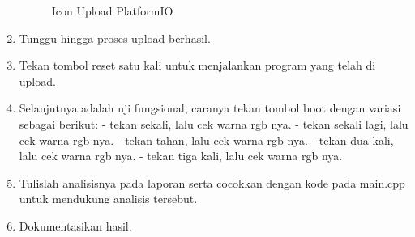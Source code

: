 \begin{enumerate}
\begin{figure}[H]
        \caption{Icon Upload PlatformIO}
        \label{fig:IconUploadPlatformIO}
    \end{figure}
    \item Tunggu hingga proses upload berhasil.
    \item Tekan tombol reset satu kali untuk menjalankan program yang telah di upload.
    \item Selanjutnya adalah uji fungsional, caranya tekan tombol boot dengan variasi sebagai berikut:
    \subitem - tekan sekali, lalu cek warna rgb nya.
    \subitem - tekan sekali lagi, lalu cek warna rgb nya.
    \subitem - tekan tahan, lalu cek warna rgb nya.
    \subitem - tekan dua kali, lalu cek warna rgb nya.
    \subitem - tekan tiga kali, lalu cek warna rgb nya.
    \item Tulislah analisisnya pada laporan serta cocokkan dengan kode pada main.cpp untuk mendukung analisis tersebut.
    \item Dokumentasikan hasil.
\end{enumerate}